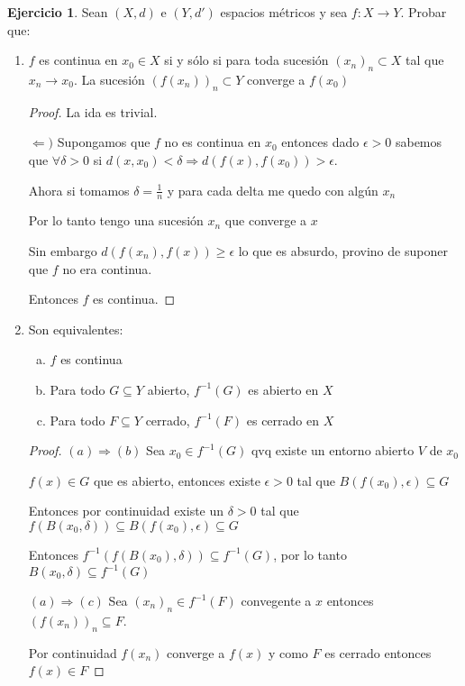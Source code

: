 \documentclass[11pt]{report}
\newcommand{\Ra}{\Rightarrow}
\newcommand{\ra}{\rightarrow}
\theoremstyle{definition}
\newtheorem{ej}{Ejercicio}
\begin{document}
	\begin{ej}
		Sean $(X,d)$ e $(Y,d')$ espacios métricos y sea $f: X \ra Y$. Probar que:
		\begin{enumerate}
			\item $f$ es continua en $x_0 \in X$ si y sólo si para toda sucesión $(x_n)_n \subset X$ tal que $x_n \ra x_0$. La sucesión $(f(x_n))_n \subset Y$ converge a $f(x_0)$

			\begin{proof}
				La ida es trivial.

				$\Leftarrow ) $ Supongamos que $f$ no es continua en $x_0$ entonces dado $\epsilon >0 $ sabemos que $\forall \delta >0 $ si $d(x,x_0) < \delta \Ra d(f(x),f(x_0)) > \epsilon$.

				Ahora si tomamos $\delta = \frac{1}{n}$ y para cada delta me quedo con algún $x_n$

				Por lo tanto tengo una sucesión $x_n$ que converge a $x$

				Sin embargo $d(f(x_n),f(x)) \geq \epsilon $ lo que es absurdo, provino de suponer que $f$ no era continua.

				Entonces $f$ es continua.
			\end{proof}
			\item 	Son equivalentes:
				\begin{enumerate}[(a)]
					\item $f$ es continua
					\item Para todo $G \subseteq Y$ abierto, $f^{-1}(G)$ es abierto en $X$
					\item Para todo $F \subseteq Y$ cerrado, $f^{-1}(F)$ es cerrado en $X$
				\end{enumerate}
				\begin{proof}
					$(a) \Ra (b) $ Sea $x_0 \in f^{-1}(G)$ qvq existe un entorno abierto $V$ de $x_0$

					$f(x) \in G$ que es abierto, entonces existe $\epsilon>0$ tal que $B(f(x_0),\epsilon) \subseteq G$

					Entonces por continuidad existe un $\delta > 0 $ tal que $f(B(x_0,\delta)) \subseteq B(f(x_0),\epsilon)\subseteq G$

					Entonces $f^{-1}(f(B(x_0),\delta))\subseteq f^{-1}(G)$, por lo tanto $B(x_0,\delta) \subseteq f^{-1}(G)$

					$(a) \Ra (c)$ Sea $(x_n)_n \in f^{-1}(F)$ convegente a $x$ entonces $(f(x_n))_n \subseteq F $.

					Por continuidad $f(x_n) $ converge a $f(x)$ y como $F$ es cerrado entonces $f(x) \in F$


\end{proof}
\end{enumerate}
\end{ej}
\end{document}
